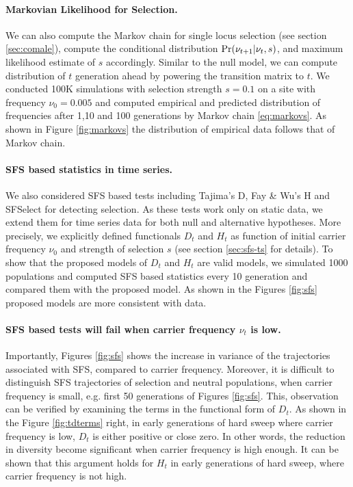 \documentclass[11pt]{article}
\begin{document}
\paragraph{Markovian Likelihood for Selection.}
We can also compute the Markov chain for single locus selection (see section 
\ref{sec:comale}), compute the conditional distribution 
$\operatorname{Pr}(\nu_{t+1}|\nu_{t},s)$, and maximum likelihood estimate of $s$ accordingly. 
Similar to the null model, we can compute distribution of $t$ generation ahead 
by powering the transition matrix to $t$.
We conducted 100K simulations with selection strength $s=0.1$ on a site with 
frequency $\nu_0=0.005$ and computed empirical and predicted distribution of 
frequencies after 1,10 and 100 generations by Markov chain \eqref{eq:markovs}. 
As shown in Figure \ref{fig:markovs} the distribution of empirical data follows 
that of Markov chain.





\paragraph{SFS based statistics in time series.}
We also considered SFS based tests including Tajima's D, Fay \& Wu's H and 
SFSelect for detecting selection. 
As these tests work only on static data, we extend them for time series data 
for both null and alternative hypotheses.
More precisely, we explicitly defined functionals $D_t$ and $H_t$ as function 
of initial carrier frequency $\nu_0$ and strength of selection $s$ (see section 
\ref{sec:sfs-ts} for details).
 To show that the proposed models of $D_t$ and $H_t$ are valid models, we 
 simulated 1000 populations and computed SFS based statistics every 10 
 generation and compared them with the proposed model.
 As shown in the Figures \ref{fig:sfs} proposed models are more consistent with data.

\paragraph{SFS based tests will fail when carrier frequency $\nu_t$ is low.}
Importantly,  Figures \ref{fig:sfs} shows the increase in variance of the trajectories associated with SFS, compared to carrier frequency. Moreover, it is difficult to distinguish SFS trajectories of selection and neutral populations, when carrier frequency is small, e.g. first 50 generations of Figures \ref{fig:sfs}.
This, observation can be verified by examining the terms in the functional form of $D_t$.
As shown in the Figure 
\ref{fig:tdterms} right, in early 
generations of hard sweep where carrier frequency is low, 
$D_t$ is either 
positive or close zero. In other words, the reduction in 
diversity become 
significant when carrier frequency is high enough.
It can be shown that this argument holds for $H_t$ in early generations 
of hard sweep, where carrier frequency is not high.
\end{document}

